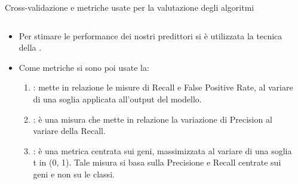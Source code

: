 \documentclass[9pt]{beamer}
\begin{document}
\begin{tframe}{Cross-validazione e metriche usate per la valutazione degli algoritmi}
\begin{columns}

    \begin{column}{.65\textwidth}
      \minipage[c][0.4\textheight][s]{\columnwidth}
	   \begin{itemize}	
	  		\item Per stimare le performance dei nostri predittori si è utilizzata la tecnica della . 
	  		\onslide<2->
	  		\item Come metriche si sono poi usate la:
	  		\begin{enumerate}
				\item {}: mette in relazione le misure di Recall e False Positive Rate, al variare di una soglia applicata all’output del modello.
				\onslide<4->	  			
				\item {}: è una misura che mette in relazione la variazione di Precision al variare della Recall. 
				\onslide<5->
	  			\item {}: è una metrica centrata sui geni, massimizzata al variare di una soglia t in (0, 1). Tale misura si basa sulla Precisione e Recall centrate sui geni e non su le classi.
	  		\end{enumerate}
	  \end{itemize}
      \endminipage      
    \end{column}
    
    
    \begin{column}{.35\textwidth}
    \end{column}


\end{columns} 
\end{tframe}
\end{document}
